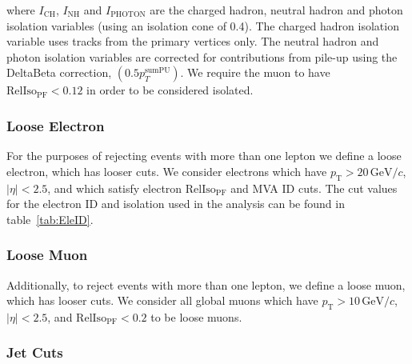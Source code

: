 where $I_{\mathrm{CH}}$, $I_{\mathrm{NH}}$ and $I_{\mathrm{PHOTON}}$
are the charged hadron, neutral hadron and photon isolation variables
(using an isolation cone of 0.4). The charged hadron isolation variable uses tracks from the primary vertices only.
The neutral hadron and photon isolation variables are corrected for
contributions from pile-up using the DeltaBeta correction, $(0.5
p_T^\mathrm{sumPU})$. We require the muon to have
$\mathrm{RelIso_{\mathrm{PF}}} < 0.12$ in order to be considered
isolated.


\subsubsection{Loose Electron}
For the purposes of rejecting events with more than one lepton we
define a loose electron, which has looser cuts. We consider electrons
which have $p_{\mathrm{T}} > 20\,\mathrm{GeV}/c$, $|\eta| < 2.5$,
and which satisfy electron $\mathrm{RelIso_{\mathrm{PF}}}$ and MVA ID
cuts. The cut values for the electron ID and isolation used in the
analysis can be found in table~\ref{tab:EleID}. 

\subsubsection{Loose Muon}
Additionally, to reject events with more than one lepton, we define a
loose muon, which has looser cuts. We consider all global muons which
have $p_{\mathrm{T}} > 10\,\mathrm{GeV}/c$, $|\eta| < 2.5$, and
$\mathrm{RelIso_{\mathrm{PF}}} < 0.2$ to be loose muons.

\subsubsection{Jet Cuts}
\label{sec:firstStep_jets}

